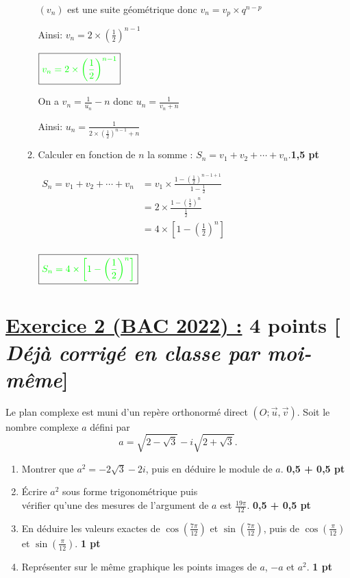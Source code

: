 \documentclass[12pt,a4paper]{article}
\begin{document}
\begin{enumerate}
\begin{enumerate}
        \((v_n)\) est une suite géométrique donc \(v_n=v_p \times q^{n-p}\)
        
        Ainsi: \(v_n=2 \times \left( \frac{1}{2}\right)^{n-1}\)
        
        \(\boxed{\textcolor{green}{v_n=2 \times \left( \frac{1}{2}\right)^{n-1}}}\)
        
        On a \(v_n = \frac{1}{u_n} - n\) donc \(u_n = \frac{1}{v_n + n}\)
        
        Ainsi: \(u_n = \frac{1}{2 \times \left( \frac{1}{2}\right)^{n-1} + n}\)
        \item Calculer en fonction de \(n\) la somme : \(S_n = v_1 + v_2 + \cdots + v_n\).\hfill \textbf{1,5 pt}
        
        \(
        \begin{aligned}
        S_n = v_1 + v_2 + \cdots + v_n &= v_1 \times \frac{1-\left( \frac{1}{2}\right)^{n-1+1} }{1-\frac{1}{2}}\\
										&=2 \times \frac{1-\left( \frac{1}{2}\right)^{n} }{\frac{1}{2}}\\ 
										&=4 \times \left[ 1-\left( \frac{1}{2}\right)^{n}\right] \\     
        \end{aligned}
        \)
        
        \(\boxed{\textcolor{green}{S_n=4 \times \left[ 1-\left( \frac{1}{2}\right)^{n}\right]}}\)
    \end{enumerate}
\end{enumerate}
\section*{\underline{Exercice 2 (BAC 2022) :} 4 points [\textit{ Déjà corrigé en classe par moi-même}]}
Le plan complexe est muni d’un repère orthonormé direct $(O; \vec{u}, \vec{v})$. Soit le nombre complexe $a$ défini par 
\[
a = \sqrt{2 - \sqrt{3}} - i\sqrt{2 + \sqrt{3}}.
\]

\begin{enumerate}
    \item Montrer que $a^2 = -2\sqrt{3} - 2i$, puis en déduire le module de $a$. \hfill \textbf{0,5 + 0,5 pt}

    \item Écrire $a^2$ sous forme trigonométrique puis \\vérifier qu’une des mesures de l’argument de $a$ est $\frac{19\pi}{12}$. \hfill \textbf{0,5 + 0,5 pt}

    \item En déduire les valeurs exactes de $\cos\left(\frac{7\pi}{12}\right)$ et $\sin\left(\frac{7\pi}{12}\right)$, puis de $\cos\left(\frac{\pi}{12}\right)$ et $\sin\left(\frac{\pi}{12}\right)$. \hfill \textbf{1 pt}

    \item Représenter sur le même graphique les points images de $a$, $-a$ et $a^2$. \hfill \textbf{1 pt}
\end{enumerate}
\end{document}
